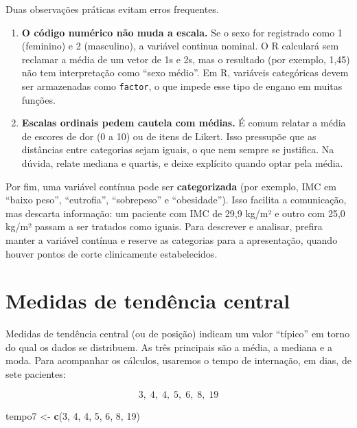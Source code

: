\documentclass[
]{book}
\newenvironment{Shaded}{\begin{snugshade}}{\end{snugshade}}
\newcommand{\DecValTok}[1]{\textcolor[rgb]{0.00,0.00,0.81}{#1}}
\newcommand{\FunctionTok}[1]{\textcolor[rgb]{0.13,0.29,0.53}{\textbf{#1}}}
\newcommand{\NormalTok}[1]{#1}
\newcommand{\OtherTok}[1]{\textcolor[rgb]{0.56,0.35,0.01}{#1}}
\providecommand{\tightlist}{%
  \setlength{\itemsep}{0pt}\setlength{\parskip}{0pt}}
\begin{document}
Duas observações práticas evitam erros frequentes.

\begin{enumerate}
\def\labelenumi{\arabic{enumi}.}
\tightlist
\item
  \textbf{O código numérico não muda a escala.} Se o sexo for registrado como 1 (feminino) e 2 (masculino), a variável continua nominal. O R calculará sem reclamar a média de um vetor de 1s e 2s, mas o resultado (por exemplo, 1,45) não tem interpretação como ``sexo médio''. Em R, variáveis categóricas devem ser armazenadas como \texttt{factor}, o que impede esse tipo de engano em muitas funções.
\item
  \textbf{Escalas ordinais pedem cautela com médias.} É comum relatar a média de escores de dor (0 a 10) ou de itens de Likert. Isso pressupõe que as distâncias entre categorias sejam iguais, o que nem sempre se justifica. Na dúvida, relate mediana e quartis, e deixe explícito quando optar pela média.
\end{enumerate}

Por fim, uma variável contínua pode ser \textbf{categorizada} (por exemplo, IMC em ``baixo peso'', ``eutrofia'', ``sobrepeso'' e ``obesidade''). Isso facilita a comunicação, mas descarta informação: um paciente com IMC de 29,9 kg/m² e outro com 25,0 kg/m² passam a ser tratados como iguais. Para descrever e analisar, prefira manter a variável contínua e reserve as categorias para a apresentação, quando houver pontos de corte clinicamente estabelecidos.

\section{Medidas de tendência central}\label{medidas-de-tenduxeancia-central}

Medidas de tendência central (ou de posição) indicam um valor ``típico'' em torno do qual os dados se distribuem. As três principais são a média, a mediana e a moda. Para acompanhar os cálculos, usaremos o tempo de internação, em dias, de sete pacientes:

\[
3,\; 4,\; 4,\; 5,\; 6,\; 8,\; 19
\]

\begin{Shaded}
\begin{Highlighting}[]
\NormalTok{tempo7 }\OtherTok{\textless{}{-}} \FunctionTok{c}\NormalTok{(}\DecValTok{3}\NormalTok{, }\DecValTok{4}\NormalTok{, }\DecValTok{4}\NormalTok{, }\DecValTok{5}\NormalTok{, }\DecValTok{6}\NormalTok{, }\DecValTok{8}\NormalTok{, }\DecValTok{19}\NormalTok{)}
\end{Highlighting}
\end{Shaded}
\end{document}
